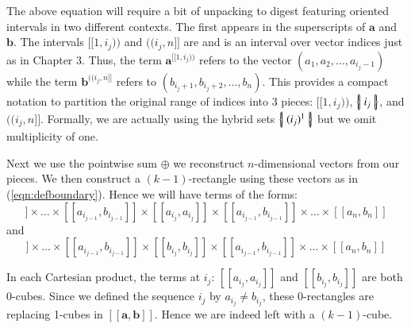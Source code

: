 The above equation will require a bit of unpacking to digest featuring oriented intervals in two different contexts.
The first appears in the superscripts of $\boldsymbol{a}$ and $\boldsymbol{b}$. 
The intervals $[\![1, i_j)\!)$ and $(\!(i_j, n]\!]$ are  and is an interval over vector indices just as in Chapter 3.
Thus, the term $\boldsymbol{a}^{[\![1,i_j)\!)}$ refers to the vector $(a_1, a_2, \ldots, a_{i_j-1})$ 
while the term $\boldsymbol{b}^{(\!(i_j,n]\!]}$ refers to $(b_{i_j+1}, b_{i_j+2}, \ldots, b_{n})$.
This provides a compact notation to partition the original range of indices into 3 pieces: $[\![ 1,i_j )\!)$, $\left\{ \! \left| \; i_j \; \right| \! \right\}$, and $(\!(i_j, n]\!]$.
Formally, we are actually using the hybrid sets $\left\{ \! \left| \; (i_j)^1 \; \right| \! \right\}$ but we omit multiplicity of one.


Next we use the pointwise sum $\oplus$ we reconstruct $n$-dimensional vectors from our pieces.
We then construct a $(k-1)$-rectangle using these vectors as in (\ref{eqn:defboundary}).
Hence we will have terms of the forms:
\begin{equation*}
	[\![a_1, b_1]\!]
	\times \ldots \times
	[\![a_{i_{j-1}}, b_{i_{j-1}}]\!]
	\times
	[\![a_{i_j}, a_{i_j}]\!]
	\times
	[\![a_{i_{j-1}}, b_{i_{j-1}}]\!]
	\times \ldots \times
	[\![a_n, b_n]\!]
\end{equation*}
and
\begin{equation*}
	[\![a_1, b_1]\!]
	\times \ldots \times
	[\![a_{i_{j-1}}, b_{i_{j-1}}]\!]
	\times
	[\![b_{i_j}, b_{i_j}]\!]
	\times
	[\![a_{i_{j-1}}, b_{i_{j-1}}]\!]
	\times \ldots \times
	[\![a_n, b_n]\!]
\end{equation*}


In each Cartesian product, the terms at $i_j$: $[\![a_{i_j}, a_{i_j}]\!]$ and $[\![b_{i_j}, b_{i_j}]\!]$ are both 0-cubes.
Since we defined the sequence $i_j$ by $a_{i_j} \neq b_{i_j}$, 
these 0-rectangles are replacing 1-cubes in $[\![\boldsymbol{a}, \boldsymbol{b}]\!]$.
Hence we are indeed left with a $(k-1)$-cube.




